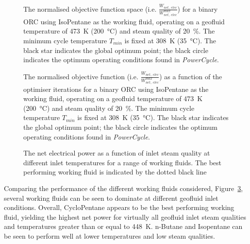     \begin{figure}[H]
        \centering
        
        \caption[The normalised objective function space for a binary \ac{ORC} using IsoPentane as the working fluid.]{The normalised objective function space (i.e. \(\frac{W_{net,\;elec}}{W_{net,\;elec}^{max}}\)) for a binary \ac{ORC} using IsoPentane as the working fluid, operating on a geofluid temperature of \qty{473}{\K} (\qty{200}{\degreeCelsius}) and steam quality of \qty{20}{\percent}. The minimum cycle temperature \(T_{min}\) is fixed at \qty{308}{\K} (\qty{35}{\degreeCelsius}). The black star indicates the global optimum point; the black circle indicates the optimum operating conditions found in \emph{PowerCycle}.}
        \label{fig:prosim_purewater_isopentane_objFunc_shape}
    \end{figure}

    \begin{figure}[H]
        \centering
        
        \caption[The normalised objective function convergence for a binary \ac{ORC} using IsoPentane as the working fluid.]{The normalised objective function (i.e. \(\frac{W_{net,\;elec}}{W_{net,\;elec}^{max}}\)) as a function of the optimiser iterations for a binary \ac{ORC} using IsoPentane as the working fluid, operating on a geofluid temperature of \qty{473}{\K} (\qty{200}{\degreeCelsius}) and steam quality of \qty{20}{\percent}. The minimum cycle temperature \(T_{min}\) is fixed at \qty{308}{\K} (\qty{35}{\degreeCelsius}). The black star indicates the global optimum point; the black circle indicates the optimum operating conditions found in \emph{PowerCycle}.}
        \label{fig:prosim_purewater_isopentane_objFunc_Convergence}
    \end{figure}

    \begin{figure}[H]
        \centering
        
        \caption[The net electrical power by working fluid.]{The net electrical power as a function of inlet steam quality at different inlet temperatures for a range of working fluids. The best performing working fluid is indicated by the dotted black line}
        \label{fig:prosim_purewater_wfs_by_temp}
    \end{figure}

    Comparing the performance of the different working fluids considered, Figure~\ref{fig:prosim_purewater_wfs_by_temp}, several working fluids can be seen to dominate at different geofluid inlet conditions. Overall, CycloPentane appears to be the best performing working fluid, yielding the highest net power for virtually all geofluid inlet steam qualities and temperatures greater than or equal to \qty{448}{\K}. n-Butane and Isopentane can be seen to perform well at lower temperatures and low steam qualities.

